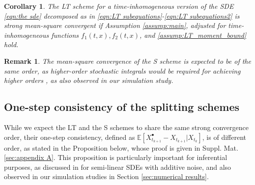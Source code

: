 \documentclass[a4paper,12pt]{article}
\numberwithin{equation}{section}
\theoremstyle{plain}
\newtheorem{remark}{Remark}
\newtheorem{corollary}[theorem]{Corollary}
\theoremstyle{definition}
\begin{document}
\begin{corollary}
The LT scheme for a time-inhomogeneous version of the SDE \eqref{eqn:the sde} decomposed as in \eqref{eqn:LT subequations}-\eqref{eqn:LT subequations2} is  strong mean-square convergent if Assumption \ref{assump:main}, adjusted for time-inhomogeneous functions $f_1(t,x), f_2(t,x)$, and \eqref{assump:LT_moment_bound} hold.
\end{corollary}
\begin{remark}
The mean-square convergence of the S scheme is expected to be of the same order, as higher-order stochastic integrals would be required for achieving higher orders \cite{BerglundLandon2012}, as also observed in our simulation study. 
\end{remark}
\subsection{One-step consistency of the splitting schemes}\label{Section3.2}
While we expect the LT and the S schemes to share the same strong convergence order, their one-step consistency, defined as $\mathbb{E}[X_{t_{k+1}}^\bullet-X_{t_{k+1}}|X_{t_k}]$, is of different order, as stated in the Proposition below, whose proof is given in Suppl. Mat. \ref{sec:appendix A}. This proposition is particularly important for inferential purposes, as discussed in \cite{pilipovic_parameter_2024} for semi-linear SDEs with additive noise, and also observed in our simulation studies in Section \ref{sec:numerical results}.
\end{document}
